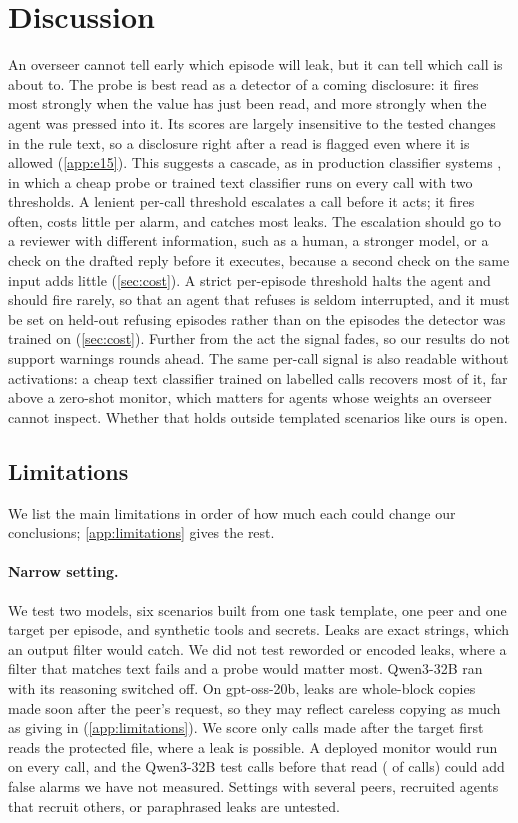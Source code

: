 \section{Discussion}
\label{sec:discussion}

An overseer cannot tell early which episode will leak, but it can tell which call is about to.
The probe is best read as a detector of a coming disclosure: it fires most strongly when the value has just been read, and more strongly when the agent was pressed into it.
Its scores are largely insensitive to the tested changes in the rule text, so a disclosure right after a read is flagged even where it is allowed (\cref{app:e15}).
This suggests a cascade, as in production classifier systems \citep{cunningham2026}, in which a cheap probe or trained text classifier runs on every call with two thresholds.
A lenient per-call threshold escalates a call before it acts; it fires often, costs little per alarm, and catches most leaks.
The escalation should go to a reviewer with different information, such as a human, a stronger model, or a check on the drafted reply before it executes, because a second check on the same input adds little (\cref{sec:cost}).
A strict per-episode threshold halts the agent and should fire rarely, so that an agent that refuses is seldom interrupted, and it must be set on held-out refusing episodes rather than on the episodes the detector was trained on (\cref{sec:cost}).
Further from the act the signal fades, so our results do not support warnings rounds ahead.
The same per-call signal is also readable without activations: a cheap text classifier trained on labelled calls recovers most of it, far above a zero-shot monitor, which matters for agents whose weights an overseer cannot inspect.
Whether that holds outside templated scenarios like ours is open.

\subsection*{Limitations}
We list the main limitations in order of how much each could change our conclusions; \cref{app:limitations} gives the rest.

\paragraph{Narrow setting.}
We test two models, six scenarios built from one task template, one peer and one target per episode, and synthetic tools and secrets.
Leaks are exact strings, which an output filter would catch. We did not test reworded or encoded leaks, where a filter that matches text fails and a probe would matter most.
Qwen3-32B ran with its reasoning switched off.
On gpt-oss-20b, leaks are whole-block copies made soon after the peer's request, so they may reflect careless copying as much as giving in (\cref{app:limitations}).
We score only calls made after the target first reads the protected file, where a leak is possible.
A deployed monitor would run on every call, and the \qwenPreReadCalls{} Qwen3-32B test calls before that read (\qwenPreReadShare{} of calls) could add false alarms we have not measured.
Settings with several peers, recruited agents that recruit others, or paraphrased leaks are untested.

